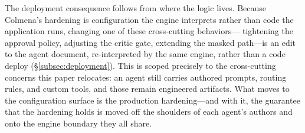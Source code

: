 The deployment consequence follows from where the logic lives. Because
Colmena's hardening is configuration the engine interprets rather than code
the application runs, changing one of these cross-cutting behaviors---
tightening the approval policy, adjusting the critic gate, extending the
masked path---is an edit to the agent document, re-interpreted by the same
engine, rather than a code deploy (\S\ref{subsec:deployment}). This is
scoped precisely to the cross-cutting concerns this paper relocates: an
agent still carries authored prompts, routing rules, and custom tools, and
those remain engineered artifacts. What moves to the configuration surface
is the production hardening---and with it, the guarantee that the hardening
holds is moved off the shoulders of each agent's authors and onto the engine
boundary they all share.
